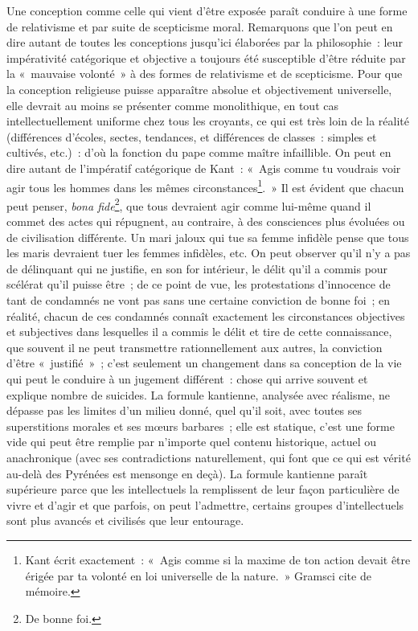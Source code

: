 \documentclass[french,twoside]{book} %
\begin{document}
Une conception comme celle qui vient d’être exposée paraît conduire à une forme de relativisme et par suite de scepticisme moral. Remarquons que l’on peut en dire autant de toutes les conceptions jusqu’ici élaborées par la philosophie : leur impérativité catégorique et objective a toujours été susceptible d’être réduite par la « mauvaise volonté » à des formes de relativisme et de scepticisme. Pour que la conception religieuse puisse apparaître absolue et objectivement universelle, elle devrait au moins se présenter comme monolithique, en tout cas intellectuellement uniforme chez tous les croyants, ce qui est très loin de la réalité (différences d’écoles, sectes, tendances, et différences de classes : simples et cultivés, etc.) : d’où la fonction du pape comme maître infaillible. On peut en dire autant de l’impératif catégorique de Kant : « Agis comme tu voudrais voir agir tous les hommes dans les mêmes circonstances\footnote{Kant écrit exactement : « Agis comme si la maxime de ton action devait être érigée par ta volonté en loi universelle de la nature. » Gramsci cite de mémoire.}. » Il est évident que chacun peut penser, \emph{bona fide}\footnote{De bonne foi.}, que tous devraient agir comme lui-même quand il commet des actes qui répugnent, au contraire, à des consciences plus évoluées ou de civilisation différente. Un mari jaloux qui tue sa femme infidèle pense que tous les maris devraient tuer les femmes infidèles, etc. On peut observer qu’il n’y a pas de délinquant qui ne justifie, en son for intérieur, le délit qu’il a commis pour scélérat qu’il puisse être ; de ce point de vue, les protestations d’innocence de tant de condamnés ne vont pas sans une certaine conviction de bonne foi ; en réalité, chacun de ces condamnés connaît exactement les circonstances objectives et subjectives dans lesquelles il a commis le délit et tire de cette connaissance, que souvent il ne peut transmettre rationnellement aux autres, la conviction d’être « justifié » ; c’est seulement un changement dans sa conception de la vie qui peut le conduire à un jugement différent : chose qui arrive souvent et explique nombre de suicides. La formule kantienne, analysée avec réalisme, ne dépasse pas les limites d’un milieu donné, quel qu’il soit, avec toutes ses superstitions morales et ses mœurs barbares ; elle est statique, c’est une forme vide qui peut être remplie par n’importe quel contenu historique, actuel ou anachronique (avec ses contradictions naturellement, qui font que ce qui est vérité au-delà des Pyrénées est mensonge en deçà). La formule kantienne paraît supérieure parce que les intellectuels la remplissent de leur façon particulière de vivre et d’agir et que parfois, on peut l’admettre, certains groupes d’intellectuels sont plus avancés et civilisés que leur entourage.\par
\end{document}
